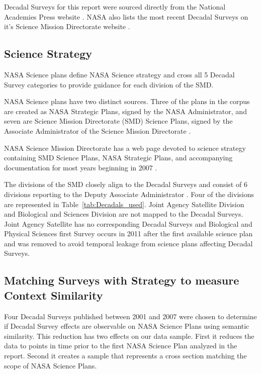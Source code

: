 \documentclass[preprint,12pt,doubleblind]{elsarticle}
\begin{document}
Decadal Surveys for this report were sourced directly from the National Academies Press website \cite{Academies_Decadal}. NASA also lists the most recent Decadal Surveys on it's Science Mission Directorate website \cite{NASA_Decadal}.

\subsection{Science Strategy}
NASA Science plans define NASA Science strategy and cross all 5 Decadal Survey categories to provide guidance for each division of the SMD. 

NASA Science plans have two distinct sources. Three of the plans in the corpus are created as NASA Strategic Plans, signed by the NASA Administrator, and seven are Science Mission Directorate (SMD) Science Plans, signed by the Associate Administrator of the Science Mission Directorate\cite{SMD_2007} \cite{SMD_2010} \cite{NSP_2011} \cite{SMD_2014} \cite{NSP_2018} \cite{SMD_2020} \cite{NSP_2022} \cite{SMD_2022} \cite{SMD_2023} \cite{SMD_2025}.

 NASA Science Mission Directorate has a web page devoted to science strategy containing SMD Science Plans, NASA Strategic Plans, and accompanying documentation for most years beginning in 2007 \cite{NASA_sci_strat}. 

 The divisions of the SMD closely align to the Decadal Surveys and consist of 6 divisions reporting to the Deputy Associate Administrator \cite{NASA_SMD}. Four of the divisions are represented in Table~\ref{tab:Decadals_used}. Joint Agency Satellite Division and Biological and Sciences Division are not mapped to the Decadal Surveys. Joint Agency Satellite has no corresponding Decadal Surveys and Biological and Physical Sciences first Survey occurs in 2011 after the first available science plan and was removed to avoid temporal leakage from science plans affecting Decadal Surveys.  

\subsection{Matching Surveys with Strategy to measure Context Similarity}
Four Decadal Surveys published between 2001 and 2007 were chosen to determine if Decadal Survey effects are observable on NASA Science Plans using semantic similarity.  This reduction has two effects on our data sample. First it reduces the data to points in time prior to the first NASA Science Plan analyzed in the report. Second it creates a sample that represents a cross section matching the scope of NASA Science Plans. 
\end{document}
